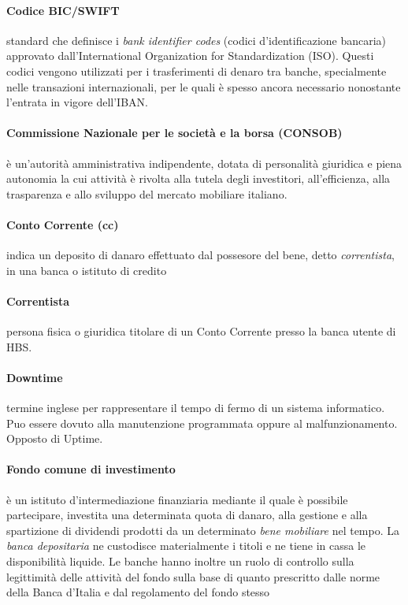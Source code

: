 \paragraph{Codice BIC/SWIFT}
	standard che definisce i \emph{bank identifier codes} (codici d'identificazione bancaria) approvato dall'International Organization for Standardization (ISO). Questi codici vengono utilizzati per i trasferimenti di denaro tra banche, specialmente nelle transazioni internazionali, per le quali è spesso ancora necessario nonostante l'entrata in vigore dell'IBAN. \cite{bic_wiki}
\paragraph{Commissione Nazionale per le societ\`a e la borsa (CONSOB)}
	è un'autorità amministrativa indipendente, dotata di personalità giuridica e piena autonomia la cui attività è rivolta alla tutela degli investitori, all'efficienza, alla trasparenza e allo sviluppo del mercato mobiliare italiano. \cite{consob_wiki}
\paragraph{Conto Corrente (cc)}
indica un deposito di danaro effettuato dal possesore del bene, detto \emph{correntista}, in una banca o istituto di credito
\paragraph{Correntista} \label{correntista}
	persona fisica o giuridica titolare di un Conto Corrente presso la banca utente di HBS.
\paragraph{Downtime}
termine inglese per rappresentare il tempo di fermo di un sistema informatico.
Puo essere dovuto alla manutenzione programmata oppure al malfunzionamento.
Opposto di Uptime.
\paragraph{Fondo comune di investimento}
	è un istituto d'intermediazione finanziaria mediante il quale è possibile partecipare, investita una determinata quota di danaro, alla gestione e alla spartizione di dividendi prodotti da un determinato \emph{bene mobiliare} nel tempo. La \emph{banca depositaria} ne custodisce materialmente i titoli e ne tiene in cassa le disponibilità liquide. Le banche hanno inoltre un ruolo di controllo sulla legittimità delle attività del fondo sulla base di quanto prescritto dalle norme della Banca d'Italia e dal regolamento del fondo stesso
